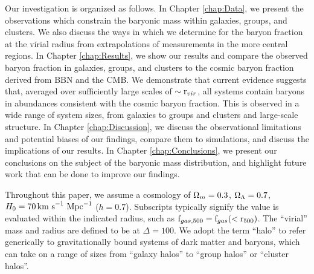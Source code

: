 Our investigation is organized as follows. In Chapter \ref{chap:Data},
we present the observations which constrain the baryonic mass within
galaxies, groups, and clusters. We also discuss the ways in which we
determine for the baryon fraction at the virial radius from
extrapolations of measurements in the more central regions. In Chapter
\ref{chap:Results}, we show our results and compare the observed
baryon fraction in galaxies, groups, and clusters to the cosmic baryon
fraction derived from BBN and the CMB. We demonstrate that current
evidence suggests that, averaged over sufficiently large scales of
$\sim\textrm{r\ensuremath{_{vir}}}$, all systems contain baryons in abundances consistent with
the cosmic baryon fraction. This is observed in a wide range of system
sizes, from galaxies to groups and clusters and large-scale
structure. In Chapter \ref{chap:Discussion}, we discuss the
observational limitations and potential biases of our findings,
compare them to simulations, and discuss the implications of our
results. In Chapter \ref{chap:Conclusions}, we present our conclusions
on the subject of the baryonic mass distribution, and highlight future
work that can be done to improve our findings.

Throughout this paper, we assume a cosmology of $\Omega_m = 0.3$,
$\Omega_\Lambda = 0.7$, $H_0 = 70\,\textrm{km~s}^{-1}~\textrm{Mpc}^{-1}$ ($h = 0.7$). Subscripts typically
signify the value is evaluated within the indicated radius, such as
$\textrm{f\ensuremath{_{gas,500}}}{} = \textrm{f\ensuremath{_{gas}}}{}(<\textrm{r\ensuremath{_{500}}})$. The ``virial'' mass and radius are
defined to be at $\Delta = 100$. We adopt the term ``halo'' to refer
generically to gravitationally bound systems of dark matter and
baryons, which can take on a range of sizes from ``galaxy halos'' to
``group halos'' or ``cluster halos''.

